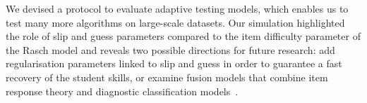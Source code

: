 \documentclass{edm_template}
\begin{document}



We devised a protocol to evaluate adaptive testing models, which enables us to test many more algorithms on large-scale datasets. Our simulation highlighted the role of slip and guess parameters compared to the item difficulty parameter of the Rasch model and reveals two possible directions for future research: add regularisation parameters linked to slip and guess in order to guarantee a fast recovery of the student skills, or examine fusion models that combine item response theory and diagnostic classification models~\cite{McGlohen2008,Bradshaw2014}.






\end{document}
